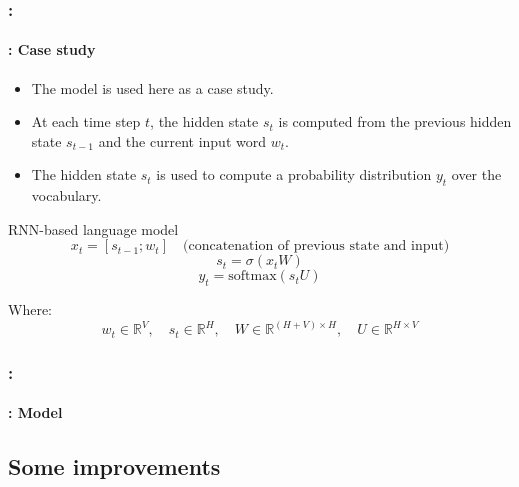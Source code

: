 \documentclass[xcolor=table]{beamer}
\begin{document}
\begin{frame}
	\frametitle{\insertshortsubtitle: \insertsection}
	\framesubtitle{\insertsubsection: Case study}
	
	\begin{itemize}
		\item The \cite{2010-mikolov-al} model is used here as a case study.
		\item At each time step $t$, the hidden state $s_t$ is computed from the previous hidden state $s_{t-1}$ and the current input word $w_t$.
		\item The hidden state $s_t$ is used to compute a probability distribution $y_t$ over the vocabulary.
	\end{itemize}
	
	\begin{block}{RNN-based language model}
		\[
		x_t = [s_{t-1}; w_t] \quad \text{(concatenation of previous state and input)}
		\]
		\[
		s_t = \sigma(x_t W)
		\]
		\[
		y_t = \text{softmax}(s_t U)
		\]
		
		Where:
		\[
		w_t \in \mathbb{R}^{V}, \quad s_t \in \mathbb{R}^{H}, \quad W \in \mathbb{R}^{(H+V)\times H}, \quad U \in \mathbb{R}^{H\times V}
		\]
	\end{block}
	
\end{frame}


\begin{frame}
	\frametitle{\insertshortsubtitle: \insertsection}
	\framesubtitle{\insertsubsection: Model}

	\begin{center}
	\end{center}

\end{frame}

\subsection{Some improvements}
\end{document}
